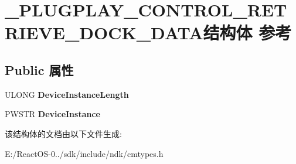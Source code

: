 \hypertarget{struct___p_l_u_g_p_l_a_y___c_o_n_t_r_o_l___r_e_t_r_i_e_v_e___d_o_c_k___d_a_t_a}{}\section{\+\_\+\+P\+L\+U\+G\+P\+L\+A\+Y\+\_\+\+C\+O\+N\+T\+R\+O\+L\+\_\+\+R\+E\+T\+R\+I\+E\+V\+E\+\_\+\+D\+O\+C\+K\+\_\+\+D\+A\+T\+A结构体 参考}
\label{struct___p_l_u_g_p_l_a_y___c_o_n_t_r_o_l___r_e_t_r_i_e_v_e___d_o_c_k___d_a_t_a}
\subsection*{Public 属性}
\begin{DoxyCompactItemize}
\item 
\mbox{\label{struct___p_l_u_g_p_l_a_y___c_o_n_t_r_o_l___r_e_t_r_i_e_v_e___d_o_c_k___d_a_t_a_a7fbd5eebad5a8601437ec76c51c9981a}} 
U\+L\+O\+NG {\bfseries Device\+Instance\+Length}
\item 
\mbox{\label{struct___p_l_u_g_p_l_a_y___c_o_n_t_r_o_l___r_e_t_r_i_e_v_e___d_o_c_k___d_a_t_a_ab75f1d87291d97a9f9823505a52a6220}} 
P\+W\+S\+TR {\bfseries Device\+Instance}
\end{DoxyCompactItemize}


该结构体的文档由以下文件生成\+:\begin{DoxyCompactItemize}
\item 
E\+:/\+React\+O\+S-\/0../sdk/include/ndk/cmtypes.\+h\end{DoxyCompactItemize}

